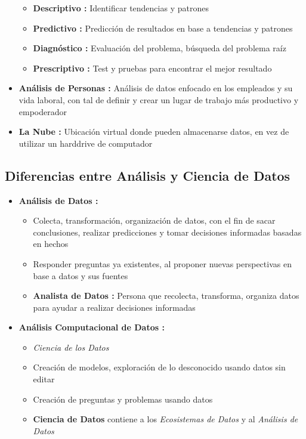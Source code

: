 \begin{itemize}
{    \begin{itemize}
        \item {\textbf{Descriptivo : }Identificar tendencias y patrones}
        \item {\textbf{Predictivo : }Predicción de resultados en base a tendencias y patrones}
        \item {\textbf{Diagnóstico : }Evaluación del problema, búsqueda del problema raíz}
        \item {\textbf{Prescriptivo : }Test y pruebas para encontrar el mejor resultado}
    \end{itemize}}
    
    \item {\textbf{Análisis de Personas : }Análisis de datos enfocado en los empleados y su vida laboral, con tal de definir y crear un lugar de trabajo más productivo y empoderador}
    
    \item {\textbf{La Nube : }Ubicación virtual donde pueden almacenarse datos, en vez de utilizar un harddrive de computador}
\end{itemize}

\subsection{Diferencias entre Análisis y Ciencia de Datos}
\begin{itemize}
    \item {\textbf{Análisis de Datos : }
    \begin{itemize}
        \item {Colecta, transformación, organización de datos, con el fin de sacar conclusiones, realizar predicciones y tomar decisiones informadas basadas en hechos}
        \item {Responder preguntas ya existentes, al proponer nuevas perspectivas en base a datos y sus fuentes}
        \item {\textbf{Analista de Datos : }Persona que recolecta, transforma, organiza datos para ayudar a realizar decisiones informadas}
    \end{itemize}}
    \item {\textbf{Análisis Computacional de Datos : }
    \begin{itemize}
        \item {\textit{Ciencia de los Datos }}
        \item {Creación de modelos, exploración de lo desconocido usando datos sin editar}
        \item {Creación de preguntas y problemas usando datos}
        \item {\textbf{Ciencia de Datos} contiene a los \textit{Ecosistemas de Datos} y al \textit{Análisis de Datos}}
    \end{itemize}}
\end{itemize}

\newpage